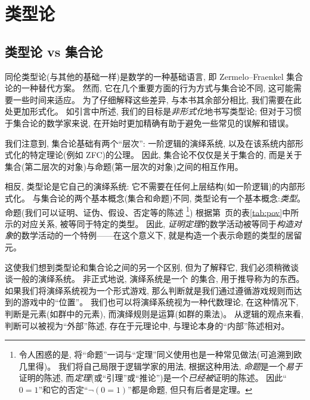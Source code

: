 \chapter{类型论}
\label{cha:typetheory}

\section{类型论 vs 集合论}
\label{sec:types-vs-sets}
\label{sec:axioms}


同伦类型论(与其他的基础一样)是数学的一种基础语言, 即 Zermelo--Fraenkel 集合论的一种替代方案。
然而, 它在几个重要方面的行为方式与集合论不同, 这可能需要一些时间来适应。
为了仔细解释这些差异, 与本书其余部分相比, 我们需要在此处更加形式化。
如引言中所述, 我们的目标是\emph{非形式化}地书写类型论; 但对于习惯于集合论的数学家来说, 在开始时更加精确有助于避免一些常见的误解和错误。

我们注意到, 集合论基础有两个``层次'': 一阶逻辑的演绎系统, 以及在该系统内部形式化的特定理论(例如 ZFC)的公理。
因此, 集合论不仅仅是关于集合的, 而是关于集合(第二层次的对象)与命题(第一层次的对象)之间的相互作用。

相反, 类型论是它自己的演绎系统: 它不需要在任何上层结构(如一阶逻辑)的内部形式化。
与集合论的两个基本概念(集合和命题)不同, 类型论有一个基本概念:\emph{类型}。
命题(我们可以证明、证伪、假设、否定等的陈述
\footnote{
  令人困惑的是, 将``命题''一词与``定理''同义使用也是一种常见做法(可追溯到欧几里得)。
  我们将自己局限于逻辑学家的用法, 根据这种用法, \emph{命题}是一个\emph{易于}证明的陈述, 
  而\emph{定理}(或``引理''或``推论'')是一个\emph{已经被}证明的陈述。
  因此``$0=1$''和它的否定``$\neg(0=1)$''都是命题, 但只有后者是定理。})
根据第~\pageref{tab:pov}页的表\ref{tab:pov}中所示的对应关系, 被等同于特定的类型。
因此, \emph{证明定理}的数学活动被等同于\emph{构造对象}的数学活动的一个特例——在这个意义下, 就是构造一个表示命题的类型的居留元。

%
这使我们想到类型论和集合论之间的另一个区别, 但为了解释它, 我们必须稍微谈谈一般的演绎系统。
非正式地说, 演绎系统是一个
%
的集合, 用于推导称为的东西。
%
如果我们将演绎系统视为一个形式游戏, 
%
那么判断就是我们通过遵循游戏规则而达到的游戏中的``位置''。
我们也可以将演绎系统视为一种代数理论, 在这种情况下, 判断是元素(如群中的元素), 而演绎规则是运算(如群的乘法)。
从逻辑的观点来看, 判断可以被视为``外部''陈述, 存在于元理论中, 与理论本身的``内部''陈述相对。


